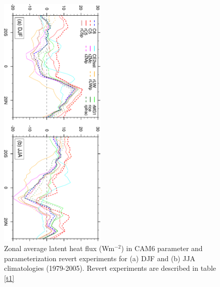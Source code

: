 \clearpage
\begin{figure}[t]
  \begin{center}
    \includegraphics[width=0.45\textwidth,angle=90.]{./figs/f_revert_LHFLX_1D.pdf}
  \end{center}
  \caption{Zonal average latent heat flux (Wm$^{-2}$) in CAM6 parameter and parameterization revert experiments for (a) DJF and (b) JJA climatologies (1979-2005). Revert experiments are described in table \ref{t1}} 
\label{f_revert_LHFLX_1D}
\end{figure} 

